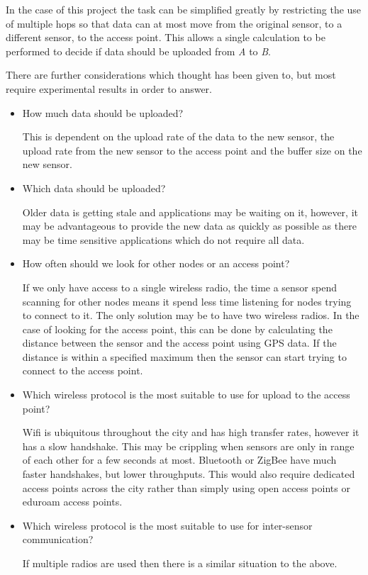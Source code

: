 In the case of this project the task can be simplified greatly by restricting the use of multiple hops so that data can at most move from the original sensor, to a different sensor, to the access point. This allows a single calculation to be performed to decide if data should be uploaded from \emph{A} to \emph{B}. 

There are further considerations which thought has been given to, but most require experimental results in order to answer. 

\begin{itemize}
	\item How much data should be uploaded?

		This is dependent on the upload rate of the data to the new sensor, the upload rate from the new sensor to the access point and the buffer size on the new sensor. 

	\item Which data should be uploaded?

		Older data is getting stale and applications may be waiting on it, however, it may be advantageous to provide the new data as quickly as possible as there may be time sensitive applications which do not require all data. 

	\item How often should we look for other nodes or an access point?

		If we only have access to a single wireless radio, the time a sensor spend scanning for other nodes means it spend less time listening for nodes trying to connect to it. The only solution may be to have two wireless radios. In the case of looking for the access point, this can be done by calculating the distance between the sensor and the access point using GPS data. If the distance is within a specified maximum then the sensor can start trying to connect to the access point. 

	\item Which wireless protocol is the most suitable to use for upload to the access point?

		Wifi is ubiquitous throughout the city and has high transfer rates, however it has a slow handshake. This may be crippling when sensors are only in range of each other for a few seconds at most. Bluetooth or ZigBee have much faster handshakes, but lower throughputs. This would also require dedicated access points across the city rather than simply using open access points or eduroam access points.

	\item Which wireless protocol is the most suitable to use for inter-sensor communication?

		If multiple radios are used then there is a similar situation to the above. 

\end{itemize}

